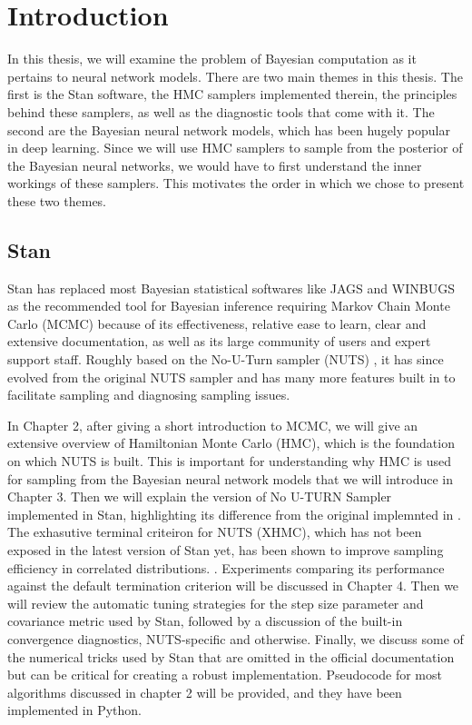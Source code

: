 \documentclass[12pt]{report}
\begin{document}
\chapter{Introduction}
In this thesis, we will examine the problem of Bayesian computation as it pertains to neural network models. There are two main themes in this thesis. The first is the Stan software, the HMC samplers implemented therein, the principles behind these samplers, as well as the diagnostic tools that come with it. The second are the Bayesian neural network models, which has been hugely popular in deep learning. Since we will use HMC samplers to sample from the posterior of the Bayesian neural networks, we would have to first understand the inner workings of these samplers. This motivates the order in which we chose to present these two themes.

\section{Stan}

Stan has replaced most Bayesian statistical softwares like JAGS and WINBUGS as the recommended tool for Bayesian inference requiring Markov Chain Monte Carlo (MCMC) because of its effectiveness, relative ease to learn, clear and extensive documentation, as well as its large community of users and expert support staff. Roughly based on the No-U-Turn sampler (NUTS) \cite{hoffman2014no}, it has since evolved from the original NUTS sampler and has many more features built in to facilitate sampling and diagnosing sampling issues.

In Chapter 2, after giving a short introduction to MCMC, we will give an extensive overview of Hamiltonian Monte Carlo (HMC), which is the foundation on which NUTS is built. This is important for understanding why HMC is used for sampling from the Bayesian neural network models that we will introduce in Chapter 3. 
Then we will explain the version of No U-TURN Sampler implemented in Stan, highlighting its difference from the original implemnted in \cite{hoffman2014no}. The exhasutive terminal criteiron for NUTS (XHMC), which has not been exposed in the latest version of Stan yet, has been shown to improve sampling efficiency in correlated distributions.  \cite{betancourt2016identifying}. Experiments comparing its performance against the default termination criterion will be discussed in Chapter 4. Then we will review the automatic tuning strategies for the step size parameter and covariance metric used by Stan, followed by a discussion of the built-in convergence diagnostics, NUTS-specific and otherwise.
Finally, we discuss some of the numerical tricks used by Stan that are omitted in the official documentation but can be critical for creating a robust implementation. Pseudocode for most algorithms discussed in chapter 2 will be provided, and they have been implemented in Python.
\end{document}
